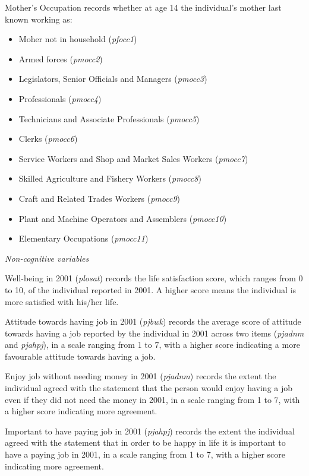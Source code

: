 \documentclass[12pt, a4paper]{article}
\begin{document}
Mother’s Occupation records whether at age 14 the individual’s mother last known working as:
\begin{itemize}
  \item Moher not in household (\textit{p\textunderscore{}focc1})
  \item Armed forces (\textit{p\textunderscore{}mocc2})
  \item Legislators, Senior Officials and Managers (\textit{p\textunderscore{}mocc3})
  \item Professionals (\textit{p\textunderscore{}mocc4})
  \item Technicians and Associate Professionals (\textit{p\textunderscore{}mocc5})
  \item Clerks (\textit{p\textunderscore{}mocc6})
  \item Service Workers and Shop and Market Sales Workers (\textit{p\textunderscore{}mocc7})
  \item Skilled Agriculture and Fishery Workers (\textit{p\textunderscore{}mocc8})
  \item Craft and Related Trades Workers (\textit{p\textunderscore{}mocc9})
  \item Plant and Machine Operators and Assemblers (\textit{p\textunderscore{}mocc10})
  \item Elementary Occupations (\textit{p\textunderscore{}mocc11})
\end{itemize}  
  
\emph{Non-cognitive variables}

Well-being in 2001 (\textit{p\textunderscore{}losat}) records the life satisfaction score, which ranges from 0 to 10, of the individual reported in 2001. A higher score means the individual is more satisfied with his/her life.

Attitude towards having job in 2001 (\textit{p\textunderscore{}jbwk}) records the average score of attitude towards having a job reported by the individual in 2001 across two items (\textit{p\textunderscore{}jadnm} and \textit{p\textunderscore{}jahpj}), in a scale ranging from 1 to 7, with a higher score indicating a more favourable attitude towards having a job. 

Enjoy job without needing money in 2001 (\textit{p\textunderscore{}jadnm}) records the extent the individual agreed with the statement that the person would enjoy having a job even if they did not need the money in 2001, in a scale ranging from 1 to 7, with a higher score indicating more agreement.

Important to have paying job in 2001 (\textit{p\textunderscore{}jahpj}) records the extent the individual agreed with the statement that in order to be happy in life it is important to have a paying job in 2001, in a scale ranging from 1 to 7, with a higher score indicating more agreement.
\end{document}
